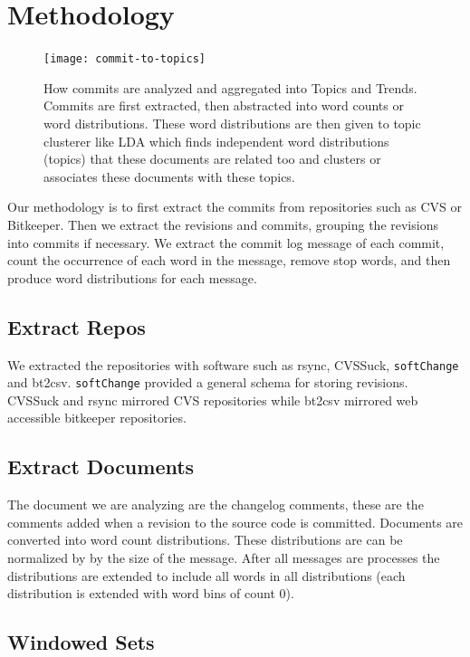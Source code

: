 \documentclass[times, 10pt,twocolumn]{article}
\begin{document}
\section{Methodology}
\begin{figure}
  \centering
  \texttt{[image: commit-to-topics]} 
  \caption{How commits are analyzed and aggregated into Topics and Trends. Commits are first extracted, then abstracted into word counts or word distributions. These word distributions are then given to topic clusterer like LDA which finds independent word distributions (topics) that these documents are related too and clusters or associates these documents with these topics.}
  \label{fig:commits}
\end{figure}

Our methodology is to first extract the commits from repositories such
as CVS or Bitkeeper. Then we extract the revisions and commits,
grouping the revisions into commits if necessary. We extract the
commit log message of each commit, count the occurrence of each word in
the message, remove stop words, and then produce word distributions
for each message.


\subsection{Extract Repos}

We extracted the repositories with software such as rsync, CVSSuck,
\texttt{softChange} and bt2csv.  \texttt{softChange} provided a
general schema for storing revisions. CVSSuck and rsync mirrored CVS
repositories while bt2csv mirrored web accessible bitkeeper
repositories.


\subsection{Extract Documents}

The document we are analyzing are the changelog comments, these are
the comments added when a revision to the source code is committed.
Documents are converted into word count distributions. These
distributions are can be normalized by by the size of the
message. After all messages are processes the distributions are
extended to include all words in all distributions (each distribution
is extended with word bins of count 0).

\subsection{Windowed Sets}
\end{document}
